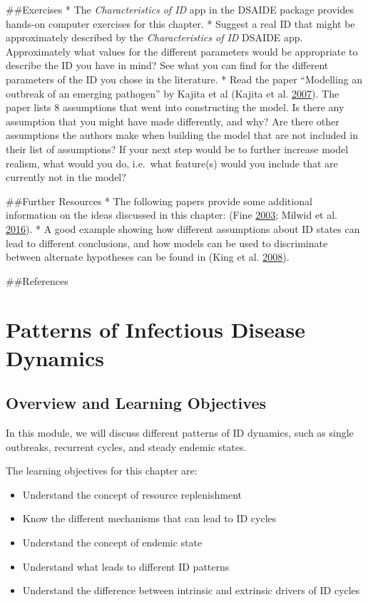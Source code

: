 \documentclass[]{book}
\providecommand{\tightlist}{%
  \setlength{\itemsep}{0pt}\setlength{\parskip}{0pt}}
\theoremstyle{definition}
\theoremstyle{definition}
\theoremstyle{definition}
\theoremstyle{remark}
\begin{document}
\#\#Exercises * The \emph{Characteristics of ID} app in the DSAIDE
package provides hands-on computer exercises for this chapter. * Suggest
a real ID that might be approximately described by the
\emph{Characteristics of ID} DSAIDE app. Approximately what values for
the different parameters would be appropriate to describe the ID you
have in mind? See what you can find for the different parameters of the
ID you chose in the literature. * Read the paper ``Modelling an outbreak
of an emerging pathogen'' by Kajita et al (Kajita et al.
\protect\hyperlink{ref-kajita07}{2007}). The paper lists 8 assumptions
that went into constructing the model. Is there any assumption that you
might have made differently, and why? Are there other assumptions the
authors make when building the model that are not included in their list
of assumptions? If your next step would be to further increase model
realism, what would you do, i.e.~what feature(s) would you include that
are currently not in the model?

\#\#Further Resources * The following papers provide some additional
information on the ideas discussed in this chapter: (Fine
\protect\hyperlink{ref-fine03}{2003}; Milwid et al.
\protect\hyperlink{ref-milwid16}{2016}). * A good example showing how
different assumptions about ID states can lead to different conclusions,
and how models can be used to discriminate between alternate hypotheses
can be found in (King et al. \protect\hyperlink{ref-king08}{2008}).

\#\#References

\hypertarget{patterns-of-infectious-disease-dynamics}{%
\chapter{Patterns of Infectious Disease
Dynamics}\label{patterns-of-infectious-disease-dynamics}}

\hypertarget{overview-and-learning-objectives-2}{%
\section{Overview and Learning
Objectives}\label{overview-and-learning-objectives-2}}

In this module, we will discuss different patterns of ID dynamics, such
as single outbreaks, recurrent cycles, and steady endemic states.

The learning objectives for this chapter are:

\begin{itemize}
\tightlist
\item
  Understand the concept of resource replenishment
\item
  Know the different mechanisms that can lead to ID cycles
\item
  Understand the concept of endemic state
\item
  Understand what leads to different ID patterns
\item
  Understand the difference between intrinsic and extrinsic drivers of
  ID cycles
\end{itemize}
\end{document}
